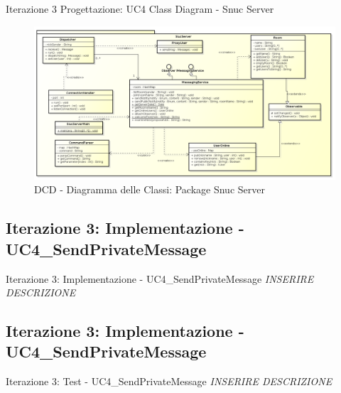 \documentclass[t]{beamer} %
\begin{document}
\begin{frame} {Iterazione 3 Progettazione: UC4 Class Diagram - Snuc Server}
   \begin{figure}
     \includegraphics[scale=0.245]{image_astah/Iteration_3_DesignModel/ClassDiagramSnucServer.png}{\centering}
     \caption{DCD - Diagramma delle Classi: Package Snuc Server }
     \label{fig_UC4_DCD_2} 
   \end{figure}
\end{frame}

\subsection {Iterazione 3: Implementazione - UC4\_SendPrivateMessage}
\begin{frame} {Iterazione 3: Implementazione - UC4\_SendPrivateMessage}
 \emph{INSERIRE DESCRIZIONE}
\end{frame}

\subsection {Iterazione 3: Implementazione - UC4\_SendPrivateMessage}
\begin{frame} {Iterazione 3: Test - UC4\_SendPrivateMessage}
 \emph{INSERIRE DESCRIZIONE}
\end{frame}
\end{document}
